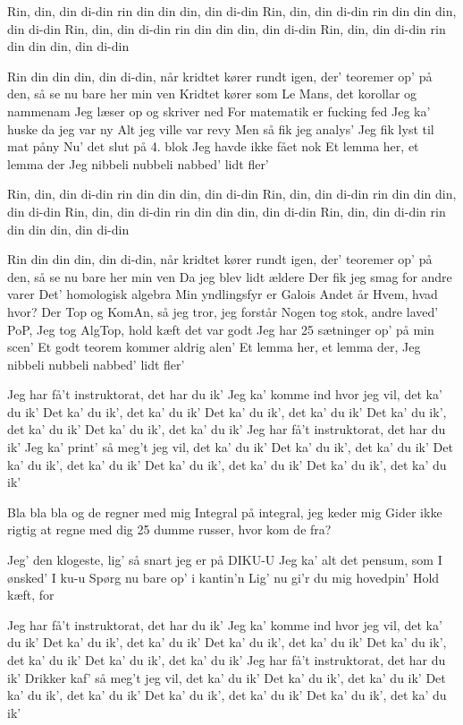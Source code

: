 \documentclass[a4paper,11pt]{article}
\begin{document}
\begin{song}
 Rin, din, din di-din
rin din din din, din di-din
Rin, din, din di-din
rin din din din, din di-din
Rin, din, din di-din
rin din din din, din di-din
Rin, din, din di-din
rin din din din, din di-din

 Rin din din din, din di-din, når kridtet kører rundt igen,
der' teoremer op' på den, så se nu bare her min ven
Kridtet kører som Le Mans, det korollar og nammenam
Jeg læser op og skriver ned
For matematik er fucking fed
Jeg ka' huske da jeg var ny
Alt jeg ville var revy
Men så fik jeg analys'
Jeg fik lyst til mat påny
Nu' det slut på 4. blok
Jeg havde ikke fået nok
Et lemma her, et lemma der
Jeg nibbeli nubbeli nabbed' lidt fler'

 Rin, din, din di-din
rin din din din, din di-din
Rin, din, din di-din
rin din din din, din di-din
Rin, din, din di-din
rin din din din, din di-din
Rin, din, din di-din
rin din din din, din di-din

 Rin din din din, din di-din, når kridtet kører rundt igen,
der' teoremer op' på den, så se nu bare her min ven
Da jeg blev lidt ældere
Der fik jeg smag for andre varer
Det' homologisk algebra
Min yndlingsfyr er Galois
Andet år
Hvem, hvad hvor?
Der Top og KomAn, så jeg tror, jeg forstår
Nogen tog stok, andre laved' PoP,
Jeg tog AlgTop, hold kæft det var godt
Jeg har 25 sætninger op' på min scen'
Et godt teorem kommer aldrig alen'
Et lemma her, et lemma der,
Jeg nibbeli nubbeli nabbed' lidt fler'

 Jeg har få’t instruktorat, det har du ik’
Jeg ka’ komme ind hvor jeg vil, det ka’ du ik’
Det ka’ du ik’, det ka’ du ik’
Det ka’ du ik’, det ka’ du ik’
Det ka’ du ik’, det ka’ du ik’
Det ka’ du ik’, det ka’ du ik’
Jeg har få’t instruktorat, det har du ik’
Jeg ka’ print’ så meg’t jeg vil, det ka’ du ik’
Det ka’ du ik’, det ka’ du ik’
Det ka’ du ik’, det ka’ du ik’
Det ka’ du ik’, det ka’ du ik’
Det ka’ du ik’, det ka’ du ik’

 Bla bla bla og de regner med mig
Integral på integral, jeg keder mig
Gider ikke rigtig at regne med dig
25 dumme russer, hvor kom de fra?

Jeg’ den klogeste, lig’ så snart jeg er på DIKU-U
Jeg ka’ alt det pensum, som I ønsked’ I ku-u
Spørg nu bare op’ i kantin’n
Lig’ nu gi’r du mig hovedpin’
Hold kæft, for

 Jeg har få’t instruktorat, det har du ik’
Jeg ka’ komme ind hvor jeg vil, det ka’ du ik’
Det ka’ du ik’, det ka’ du ik’
Det ka’ du ik’, det ka’ du ik’
Det ka’ du ik’, det ka’ du ik’
Det ka’ du ik’, det ka’ du ik’
Jeg har få’t instruktorat, det har du ik’
Drikker kaf’ så meg’t jeg vil, det ka’ du ik’
Det ka’ du ik’, det ka’ du ik’
Det ka’ du ik’, det ka’ du ik’
Det ka’ du ik’, det ka’ du ik’
Det ka’ du ik’, det ka’ du ik’


\end{song}
\end{document}

